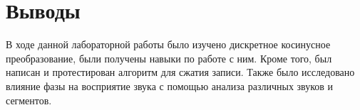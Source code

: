 \documentclass[a4paper, 14pt]{extarticle}
\begin{document}
    \newpage

    \section{Выводы}
    \label{sec:conclusions}

    В ходе данной лабораторной работы было изучено дискретное косинусное преобразование, были получены навыки по работе
    с ним. Кроме того, был написан и протестирован алгоритм для сжатия записи. Также было исследовано влияние фазы на
    восприятие звука с помощью анализа различных звуков и сегментов.
\end{document}
